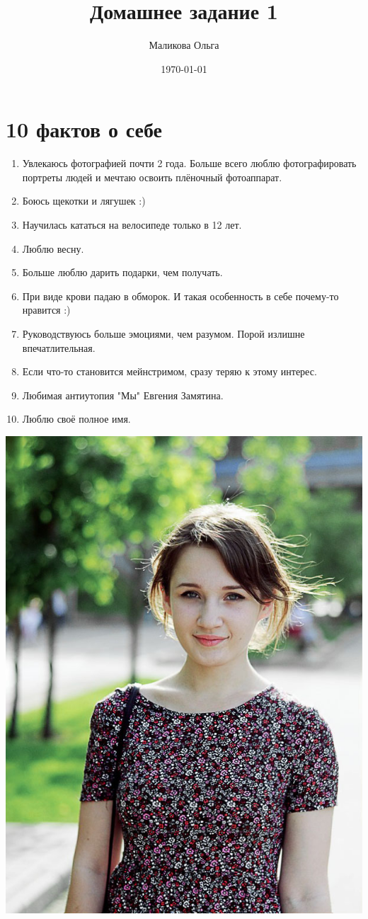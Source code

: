 \documentclass[12pt, a4paper]{article}
\author{Маликова Ольга}
\title{Домашнее задание 1}
\date{\today}
\begin{document}
\maketitle

\section{10 фактов о себе}

\begin{enumerate}
\item Увлекаюсь фотографией почти 2 года. Больше всего люблю фотографировать портреты людей и мечтаю освоить плёночный фотоаппарат. 
\item Боюсь щекотки и лягушек :)
\item Научилась кататься на велосипеде только в 12 лет.
\item Люблю весну.
\item Больше люблю дарить подарки, чем получать.
\item При виде крови падаю в обморок. И такая особенность в себе почему-то нравится :)
\item Руководствуюсь больше эмоциями, чем разумом. Порой излишне впечатлительная.
\item Если что-то становится мейнстримом, сразу теряю к этому интерес.
\item Любимая антиутопия "Мы" Евгения Замятина.
\item Люблю своё полное имя.
\end{enumerate}

\includegraphics[width=15 cm]{olia.jpg}
\end{document}
